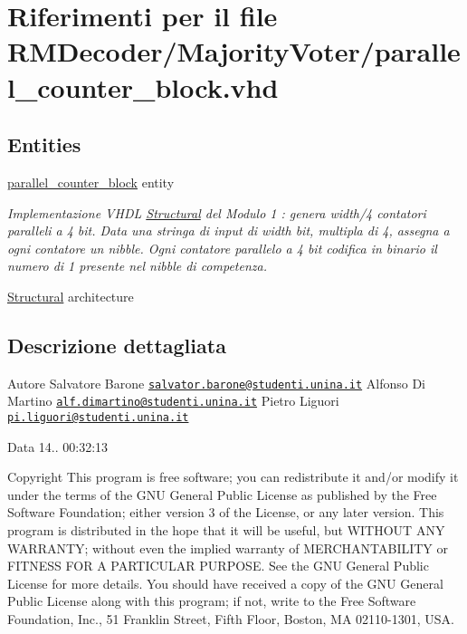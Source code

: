 \hypertarget{parallel__counter__block_8vhd}{\section{Riferimenti per il file R\+M\+Decoder/\+Majority\+Voter/parallel\+\_\+counter\+\_\+block.vhd}
\label{parallel__counter__block_8vhd}
}
\subsection*{Entities}
\begin{DoxyCompactItemize}
\item 
\hyperlink{classparallel__counter__block}{parallel\+\_\+counter\+\_\+block} entity
\begin{DoxyCompactList}\small\item\em Implementazione V\+H\+D\+L \hyperlink{classparallel__counter__block_1_1_structural}{Structural} del Modulo 1 \+: genera width/4 contatori paralleli a 4 bit. Data una stringa di input di width bit, multipla di 4, assegna a ogni contatore un nibble. Ogni contatore parallelo a 4 bit codifica in binario il numero di 1 presente nel nibble di competenza. \end{DoxyCompactList}\item 
\hyperlink{classparallel__counter__block_1_1_structural}{Structural} architecture
\end{DoxyCompactItemize}


\subsection{Descrizione dettagliata}
\begin{DoxyAuthor}{Autore}
Salvatore Barone \href{mailto:salvator.barone@studenti.unina.it}{\tt salvator.\+barone@studenti.\+unina.\+it} Alfonso Di Martino \href{mailto:alf.dimartino@studenti.unina.it}{\tt alf.\+dimartino@studenti.\+unina.\+it} Pietro Liguori \href{mailto:pi.liguori@studenti.unina.it}{\tt pi.\+liguori@studenti.\+unina.\+it} 
\end{DoxyAuthor}
\begin{DoxyDate}{Data}
14.. 00\+:32\+:13
\end{DoxyDate}
\begin{DoxyCopyright}{Copyright}
This program is free software; you can redistribute it and/or modify it under the terms of the G\+N\+U General Public License as published by the Free Software Foundation; either version 3 of the License, or any later version. This program is distributed in the hope that it will be useful, but W\+I\+T\+H\+O\+U\+T A\+N\+Y W\+A\+R\+R\+A\+N\+T\+Y; without even the implied warranty of M\+E\+R\+C\+H\+A\+N\+T\+A\+B\+I\+L\+I\+T\+Y or F\+I\+T\+N\+E\+S\+S F\+O\+R A P\+A\+R\+T\+I\+C\+U\+L\+A\+R P\+U\+R\+P\+O\+S\+E. See the G\+N\+U General Public License for more details. You should have received a copy of the G\+N\+U General Public License along with this program; if not, write to the Free Software Foundation, Inc., 51 Franklin Street, Fifth Floor, Boston, M\+A 02110-\/1301, U\+S\+A. 
\end{DoxyCopyright}
